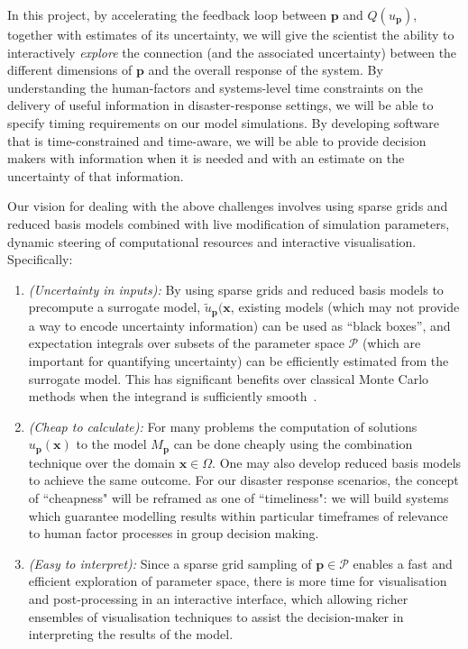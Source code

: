 \documentclass[a4paper,fontsize=12pt]{scrartcl}
\begin{document}
In this project, by accelerating the feedback loop between $\mathbf{p}$ and
$Q(u_{\mathbf{p}})$, together with estimates of its uncertainty, we will give
the scientist the ability to interactively \emph{explore} the
connection (and the associated uncertainty) between the different
dimensions of $\mathbf{p}$ and the overall response of the system.
By understanding the human-factors and systems-level time constraints on the delivery of useful information in
disaster-response settings, we will be able to specify timing requirements on our model simulations.
By developing software that is time-constrained and time-aware, we will be able to provide decision makers
with information when it is needed and with an estimate on the uncertainty of that information. 


Our vision for dealing with the above challenges
involves using sparse grids and reduced basis models 
combined with live modification
of simulation parameters, dynamic steering of computational resources and
interactive visualisation. Specifically:
\begin{enumerate}
\item \emph{(Uncertainty in inputs):} By using sparse grids and reduced basis models to precompute
  a surrogate model, $\tilde{u}_{\mathbf{p}}(\mathbf{x}$, 
  existing models (which may not
  provide a way to encode uncertainty information) can be used as
  ``black boxes'', and expectation integrals over subsets of the
  parameter space $\mathcal{P}$ (which are important for quantifying
  uncertainty) can be efficiently estimated from the
  surrogate model. This has
  significant benefits over classical Monte Carlo methods when the
  integrand is sufficiently
  smooth~\parencite{JakemanRoberts2013,FranzelinDiehlPfluger2014}.

\item \emph{(Cheap to calculate):} For many problems the computation of solutions 
  $u_{\mathbf{p}}(\mathbf{x})$ to the model $M_{\mathbf{p}}$ can be done 
  cheaply using the combination technique over the domain
  $\mathbf{x}\in\Omega$.
  One may also develop reduced basis models to achieve the same outcome. For our disaster response scenarios, the concept of ``cheapness" will be reframed as one of ``timeliness": we will build systems which guarantee modelling results within particular timeframes of relevance to human factor processes in group decision making.

\item \emph{(Easy to interpret):} Since a sparse grid sampling of $\mathbf{p}\in\mathcal{P}$ enables a fast 
  and efficient exploration of parameter space, there is more time for
  visualisation and post-processing in an interactive interface, which
  allowing richer ensembles of visualisation techniques to assist the
  decision-maker in interpreting the results of the model.
\end{enumerate}
\end{document}
